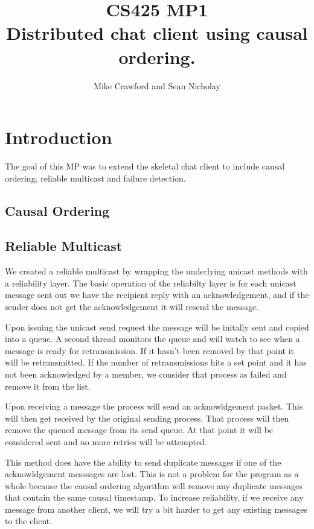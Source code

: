 \documentclass{article}
\begin{document}
\title{CS425 MP1 \\ \large Distributed chat client using causal ordering.}
\author{Mike Crawford and Sean Nicholay}

\maketitle

\section{Introduction}
The goal of this MP was to extend the skeletal chat client to include causal ordering, reliable multicast and failure detection.  

\subsection{Causal Ordering}

\subsection{Reliable Multicast}
We created a reliable multicast by wrapping the underlying unicast methods with a reliability layer.  The basic operation of the reliabilty layer is for each unicast message sent out we have the recipient reply with an acknowledgement, and if the sender does not get the acknowledgement it will resend the message.  

Upon issuing the unicast send request the message will be initally sent and copied into a queue.  A second thread monitors the queue and will watch to see when a message is ready for retransmission.  If it hasn't been removed by that point it will be retransmitted.  If the number of retransmissions hits a set point and it has not been acknowledged by a member, we consider that process as failed and remove it from the list.

Upon receiving a message the process will send an acknowldgement packet.  This will then get received by the original sending process.  That process will then remove the queued message from its send queue.  At that point it will be considered sent and no more retries will be attempted.

This method does have the ability to send duplicate messages if one of the acknowldgement messsages are lost.  This is not a problem for the program as a whole because the causal ordering algorithm will remove any duplicate messages that contain the same causal timestamp.  To increase reliability, if we receive any message from another client, we will try a bit harder to get any existing messages to the client.
\end{document}
